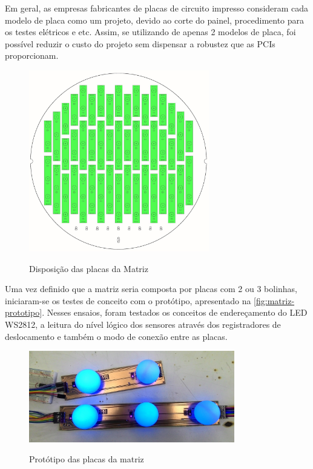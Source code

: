 Em geral, as empresas fabricantes de placas de circuito impresso consideram cada modelo de placa como um projeto, devido ao corte do painel, procedimento para os testes elétricos e etc. Assim, se utilizando de apenas 2 modelos de placa, foi possível reduzir o custo do projeto sem dispensar a robustez que as PCIs proporcionam.

\begin{figure}[H]
    \centering
    \caption{Disposição das placas da Matriz}
    \includegraphics[width=0.7\textwidth]{./dados/figuras/placas-matriz-colunas}
    \label{fig:placas-matriz-colunas}
\end{figure}

Uma vez definido que a matriz seria composta por placas com 2 ou 3 bolinhas, iniciaram-se os testes de conceito com o protótipo, apresentado na \autoref{fig:matriz-prototipo}. Nesses ensaios, foram testados os conceitos de endereçamento do LED WS2812, a leitura do nível lógico dos sensores através dos registradores de deslocamento e também o modo de conexão entre as placas.

\begin{figure}[H]
    \centering
    \caption{Protótipo das placas da matriz}
    \includegraphics[width=0.8\textwidth]{./dados/figuras/mesa-protoboard}
    \label{fig:matriz-prototipo}
\end{figure}

